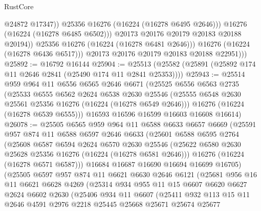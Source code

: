 \begin{lexlean}{RustCore}
\begin{coremodule}
                          @24872
                          @17347))
                      @25356
                      @16276
                      (@16224 (@16278 @6495 @2646)))
                    @16276
                    (@16224 (@16278 @6485 @6502)))
                  @20173
                  @20176
                  @20179
                  @20183
                  @20188
                  @20194))
              @25356
              @16276
              (@16224 (@16278 @6481 @2646)))
            @16276
            (@16224 (@16278 @6436 @6517)))
          @20173
          @20176
          @20179
          @20183
          @20188
          @22951)))
@25892 := @16792 @16144
@25904 := @25513 (@25582 (@25891 (@25892 @174 @11 @2646 @2841 (@25490 @174 @11 @2841 @25353))))
@25943 := @25514
    @959
    @964
    @11
    @6556
    @6565
    @2646
    @6671
    (@25525
      @6556
      @6563
      @2735
      (@25533
        @6555
        @6562
        @2624
        @6538
        @2630
        @25546
        (@25555 @6548 @2630 @25561 @25356 @16276 (@16224 (@16278 @6549 @2646)))
        @16276
        (@16224 (@16278 @6539 @6555)))
      @16593
      @16596
      @16599
      @16603
      @16608
      @16614)
@26078 := @25505
    @6565
    @959
    @964
    @11
    @6588
    @6633
    @6657
    @6669
    (@25591
      @957
      @874
      @11
      @6588
      @6597
      @2646
      @6633
      (@25601
        @6588
        @6595
        @2764
        (@25608
          @6587
          @6594
          @2624
          @6570
          @2630
          @25546
          (@25622 @6580 @2630 @25628 @25356 @16276 (@16224 (@16278 @6581 @2646)))
          @16276
          (@16224 (@16278 @6571 @6587)))
        @16684
        @16687
        @16690
        @16694
        @16699
        @16705)
      (@25505
        @6597
        @957
        @874
        @11
        @6621
        @6630
        @2646
        @6121
        (@25681
          @956
          @16
          @11
          @6621
          @6628
          @4269
          (@25314
            @934
            @955
            @11
            @15
            @6607
            @6620
            @6627
            @2624
            @6602
            @2630
            (@25406
              @934
              @11
              @6607
              (@25411
                @932
                @113
                @15
                @11
                @2646
                @4591
                @2976
                @2218
                @25445
                @25668
                @25671
                @25674
                @25677

\end{coremodule}
\end{lexlean}
